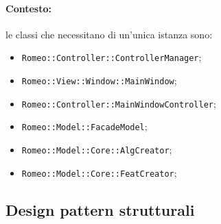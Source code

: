 \paragraph{Contesto:} le classi che necessitano di un'unica istanza sono:
\begin{itemize}
	\item \verb!Romeo::Controller::ControllerManager!;
	\item \verb!Romeo::View::Window::MainWindow!;
	\item \verb!Romeo::Controller::MainWindowController!;
	\item \verb!Romeo::Model::FacadeModel!;
	\item \verb!Romeo::Model::Core::AlgCreator!;
	\item \verb!Romeo::Model::Core::FeatCreator!;
\end{itemize}
\pagebreak
\subsection{Design pattern strutturali}
\label{patt_strutt}
